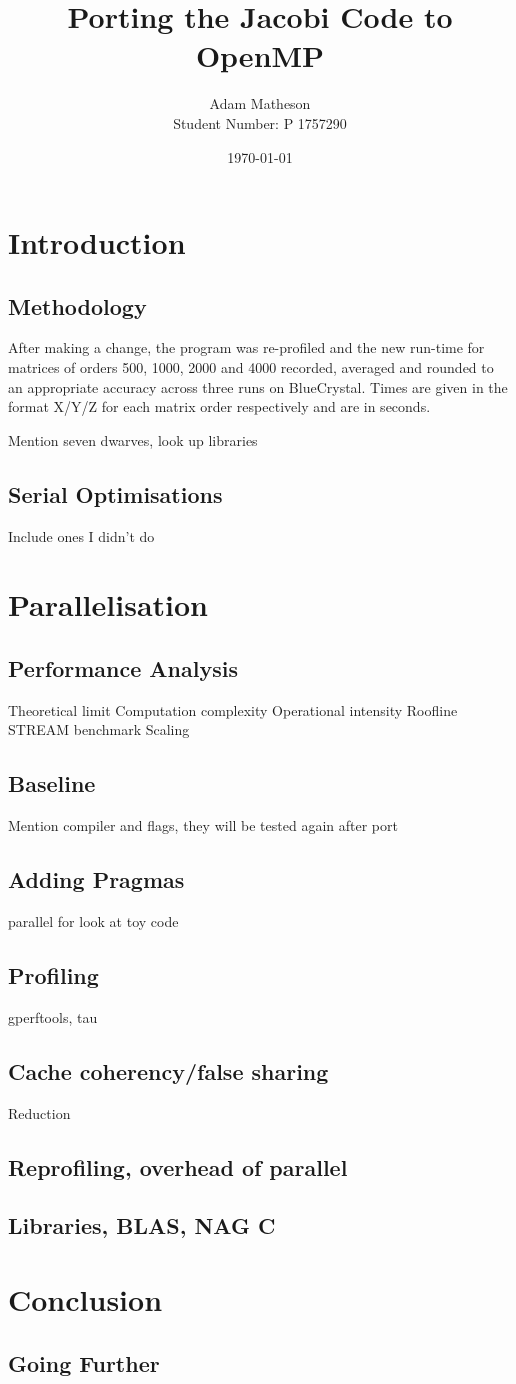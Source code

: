 \documentclass{article}
\begin{document}
\title{Porting the Jacobi Code to OpenMP}
\author{Adam Matheson \\
Student Number: P 1757290}
\date{\today}
\maketitle

\section{Introduction}
\subsection{Methodology}
After making a change, the program was re-profiled and the new run-time for matrices of orders 500, 1000, 2000 and 4000 recorded, averaged and rounded to an appropriate accuracy across three runs on BlueCrystal. Times are given in the format X/Y/Z for each matrix order respectively and are in seconds.

Mention seven dwarves, look up libraries

\subsection{Serial Optimisations}
Include ones I didn't do

\section{Parallelisation}

\subsection{Performance Analysis}
Theoretical limit
Computation complexity
Operational intensity
Roofline
STREAM benchmark
Scaling
\subsection{Baseline}
Mention compiler and flags, they will be tested again after port
\subsection{Adding Pragmas}
parallel for
look at toy code
\subsection{Profiling}
gperftools, tau
\subsection{Cache coherency/false sharing}
Reduction
\subsection{Reprofiling, overhead of parallel}
\subsection{Libraries, BLAS, NAG C}

\section{Conclusion}
\subsection{Going Further}
\end{document}
